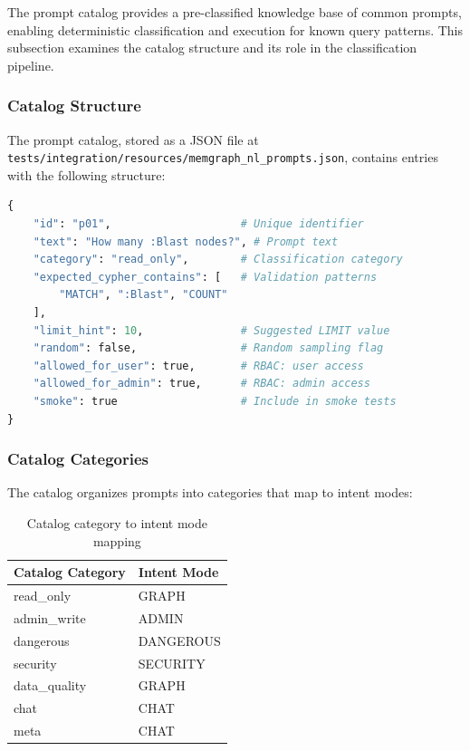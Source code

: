 The prompt catalog provides a pre-classified knowledge base of common prompts, enabling deterministic classification and execution for known query patterns. This subsection examines the catalog structure and its role in the classification pipeline.

\subsubsection{Catalog Structure}

The prompt catalog, stored as a JSON file at \texttt{tests/integration/resources/memgraph\_nl\_prompts.json}, contains entries with the following structure:

\begin{lstlisting}[language=Python, caption={Prompt catalog entry structure}, label=lst:catalog-entry]
{
    "id": "p01",                    # Unique identifier
    "text": "How many :Blast nodes?", # Prompt text
    "category": "read_only",        # Classification category
    "expected_cypher_contains": [   # Validation patterns
        "MATCH", ":Blast", "COUNT"
    ],
    "limit_hint": 10,               # Suggested LIMIT value
    "random": false,                # Random sampling flag
    "allowed_for_user": true,       # RBAC: user access
    "allowed_for_admin": true,      # RBAC: admin access
    "smoke": true                   # Include in smoke tests
}
\end{lstlisting}

\subsubsection{Catalog Categories}

The catalog organizes prompts into categories that map to intent modes:

\begin{table}[htbp]
\centering
\caption{Catalog category to intent mode mapping}
\label{tab:category-mapping}
\begin{tabular}{ll}
\hline
\textbf{Catalog Category} & \textbf{Intent Mode} \\
\hline
read\_only & GRAPH \\
admin\_write & ADMIN \\
dangerous & DANGEROUS \\
security & SECURITY \\
data\_quality & GRAPH \\
chat & CHAT \\
meta & CHAT \\
\hline
\end{tabular}
\end{table}

